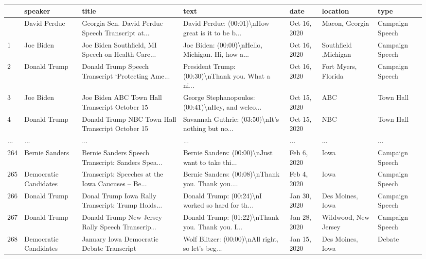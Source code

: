 \documentclass[
  letterpaper,
  DIV=11,
  numbers=noendperiod]{scrartcl}
\begin{document}
\begin{longtable}[]{@{}lllllll@{}}
\toprule\noalign{}
& speaker & title & text & date & location & type \\
\midrule\noalign{}
\endhead
\bottomrule\noalign{}
\endlastfoot
0 & David Perdue & Georgia Sen. David Perdue Speech Transcript at... &
David Perdue: (00:01)\textbackslash nHow great is it to be b... & Oct
16, 2020 & Macon, Georgia & Campaign Speech \\
1 & Joe Biden & Joe Biden Southfield, MI Speech on Health Care... & Joe
Biden: (00:00)\textbackslash nHello, Michigan. Hi, how a... & Oct 16,
2020 & Southfield ,Michigan & Campaign Speech \\
2 & Donald Trump & Donald Trump Speech Transcript `Protecting Ame... &
President Trump: (00:30)\textbackslash nThank you. What a ni... & Oct
16, 2020 & Fort Myers, Florida & Campaign Speech \\
3 & Joe Biden & Joe Biden ABC Town Hall Transcript October 15 & George
Stephanopoulos: (00:41)\textbackslash nHey, and welco... & Oct 15, 2020
& ABC & Town Hall \\
4 & Donald Trump & Donald Trump NBC Town Hall Transcript October 15 &
Savannah Guthrie: (03:50)\textbackslash nIt's nothing but no... & Oct
15, 2020 & NBC & Town Hall \\
... & ... & ... & ... & ... & ... & ... \\
264 & Bernie Sanders & Bernie Sanders Speech Transcript: Sanders Spea...
& Bernie Sanders: (00:00)\textbackslash nJust want to take thi... & Feb
6, 2020 & Iowa & Campaign Speech \\
265 & Democratic Candidates & Transcript: Speeches at the Iowa Caucuses
-- Be... & Bernie Sanders: (00:08)\textbackslash nThank you. Thank
you.... & Feb 4, 2020 & Iowa & Campaign Speech \\
266 & Donald Trump & Donal Trump Iowa Rally Transcript: Trump Holds... &
Donald Trump: (00:24)\textbackslash nI worked so hard for th... & Jan
30, 2020 & Des Moines, Iowa & Campaign Speech \\
267 & Donald Trump & Donald Trump New Jersey Rally Speech Transcrip... &
Donald Trump: (01:22)\textbackslash nThank you. Thank you. I... & Jan
28, 2020 & Wildwood, New Jersey & Campaign Speech \\
268 & Democratic Candidates & January Iowa Democratic Debate Transcript
& Wolf Blitzer: (00:00)\textbackslash nAll right, so let's beg... & Jan
15, 2020 & Des Moines, Iowa & Debate \\
\end{longtable}
\end{document}
